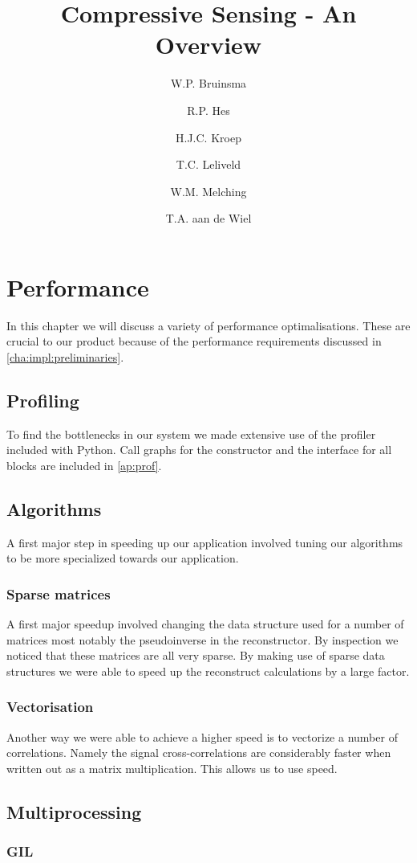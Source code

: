 \documentclass[a4paper, openany, oneside]{memoir}
\title{Compressive Sensing - An Overview}
\author{W.P. Bruinsma \and R.P. Hes \and H.J.C. Kroep \and T.C. Leliveld \and W.M. Melching \and T.A. aan de Wiel}
\begin{document}
\chapter{Performance}
In this chapter we will discuss a variety of performance optimalisations. These are crucial to our product because of the performance requirements discussed in \cref{cha:impl:preliminaries}.

\section{Profiling}
\label{sec:profiling}
To find the bottlenecks in our system we made extensive use of the profiler included with Python. Call graphs for the constructor and the interface for all blocks are included in \cref{ap:prof}.

\section{Algorithms}
A first major step in speeding up our application involved tuning our algorithms to be more specialized towards our application.

\subsection{Sparse matrices}
\label{sec:sparse-matrices}
A first major speedup involved changing the data structure used for a number of matrices most notably the pseudoinverse in the reconstructor. By inspection we noticed that these matrices are all very sparse. By making use of  sparse data structures we were able to speed up the reconstruct calculations by a large factor.

\subsection{Vectorisation}
\label{sec:vectorisation}
Another way we were able to achieve a higher speed is to vectorize a number of correlations. Namely the signal cross-correlations are considerably faster when written out as a matrix multiplication. This allows us to use  speed.

\section{Multiprocessing}
\label{sec:multiprocessing}


\subsection{GIL}
\label{sec:gil}
\end{document}
